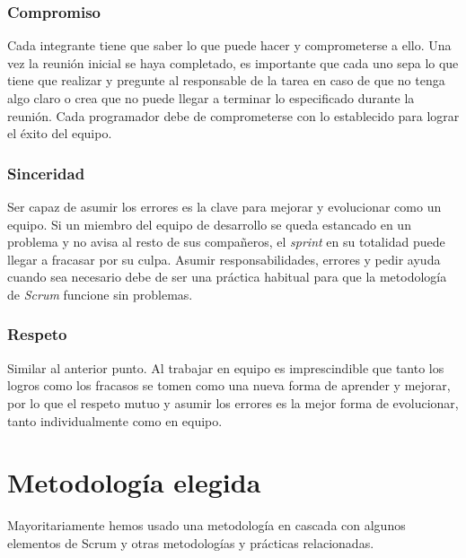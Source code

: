 \subsubsection{Compromiso}

Cada integrante tiene que saber lo que puede hacer y comprometerse a ello. Una vez la reunión inicial se haya completado, es importante que cada uno sepa lo que tiene que realizar y pregunte al responsable de la tarea en caso de que no tenga algo claro o crea que no puede llegar a terminar lo especificado durante la reunión. Cada programador debe de comprometerse con lo establecido para lograr el éxito del equipo.

\subsubsection{Sinceridad}

Ser capaz de asumir los errores es la clave para mejorar y evolucionar como un equipo. Si un miembro del equipo de desarrollo se queda estancado en un problema y no avisa al resto de sus compañeros, el \textit{sprint} en su totalidad puede llegar a fracasar por su culpa. Asumir responsabilidades, errores y pedir ayuda cuando sea necesario debe de ser una práctica habitual para que la metodología de \textit{Scrum} funcione sin problemas.

\subsubsection{Respeto}

Similar al anterior punto. Al trabajar en equipo es imprescindible que tanto los logros como los fracasos se tomen como una nueva forma de aprender y mejorar, por lo que el respeto mutuo y asumir los errores es la mejor forma de evolucionar, tanto individualmente como en equipo.

\section{Metodología elegida}
\label{sec:metodologiaelegida}

Mayoritariamente hemos usado una metodología en cascada con algunos elementos de Scrum y otras metodologías y prácticas relacionadas.

